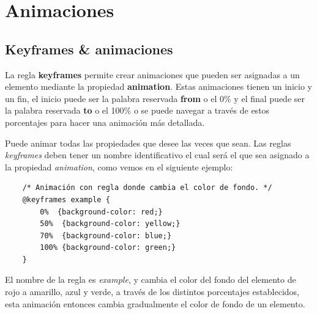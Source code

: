 \section{Animaciones}


\subsection{Keyframes \& animaciones}

La regla \textbf{keyframes} permite crear animaciones que pueden ser asignadas a un elemento mediante la propiedad \textbf{animation}. Estas animaciones tienen un inicio y un fin, el inicio puede ser la palabra reservada \textbf{from} o el 0\% y el final puede ser la palabra reservada \textbf{to} o el 100\% o se puede navegar a través de estos porcentajes para hacer una animación más detallada.

Puede animar todas las propiedades que desee las veces que sean. Las reglas \textit{keyframes} deben tener un nombre identificativo el cual será el que sea asignado a la propiedad \textit{animation}, como vemos en el siguiente ejemplo:
\begin{lstlisting}
    /* Animación con regla donde cambia el color de fondo. */
    @keyframes example {
        0%  {background-color: red;}
        50%  {background-color: yellow;}
        70%  {background-color: blue;}
        100% {background-color: green;}
    }
\end{lstlisting}

El nombre de la regla es \textit{example}, y cambia el color del fondo del elemento de rojo a amarillo, azul y verde, a través de los distintos porcentajes establecidos, esta animación entonces cambia gradualmente el color de fondo de un elemento.


